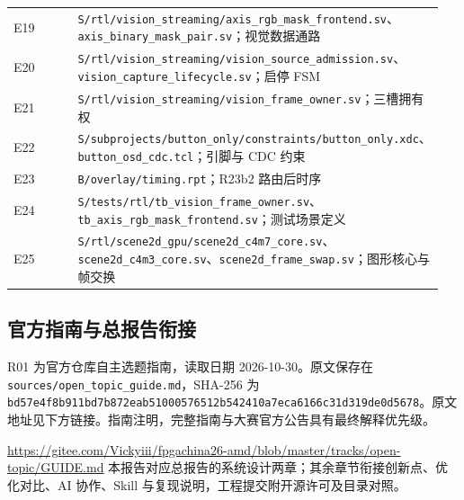 {\begin{longtable}{@{}>{\raggedright\arraybackslash}p{0.29\linewidth}>{\raggedright\arraybackslash}p{0.66\linewidth}@{}}
E19 & \nolinkurl{S/rtl/vision_streaming/axis_rgb_mask_frontend.sv}、\nolinkurl{axis_binary_mask_pair.sv}；视觉数据通路\\
E20 & \nolinkurl{S/rtl/vision_streaming/vision_source_admission.sv}、\nolinkurl{vision_capture_lifecycle.sv}；启停 FSM\\
E21 & \nolinkurl{S/rtl/vision_streaming/vision_frame_owner.sv}；三槽拥有权\\
E22 & \nolinkurl{S/subprojects/button_only/constraints/button_only.xdc}、\nolinkurl{button_osd_cdc.tcl}；引脚与 CDC 约束\\
E23 & \nolinkurl{B/overlay/timing.rpt}；R23b2 路由后时序\\
E24 & \nolinkurl{S/tests/rtl/tb_vision_frame_owner.sv}、\nolinkurl{tb_axis_rgb_mask_frontend.sv}；测试场景定义\\
E25 & \nolinkurl{S/rtl/scene2d_gpu/scene2d_c4m7_core.sv}、\nolinkurl{scene2d_c4m3_core.sv}、\nolinkurl{scene2d_frame_swap.sv}；图形核心与帧交换\\
\end{longtable}}
\subsection{官方指南与总报告衔接}
R01 为官方仓库自主选题指南，读取日期 2026-10-30。原文保存在 \nolinkurl{sources/open_topic_guide.md}，SHA-256 为 \nolinkurl{bd57e4f8b911bd7b872eab51000576512b542410a7eca6166c31d319de0d5678}。原文地址见下方链接。指南注明，完整指南与大赛官方公告具有最终解释优先级。

\url{https://gitee.com/Vickyiii/fpgachina26-amd/blob/master/tracks/open-topic/GUIDE.md}
本报告对应总报告的系统设计两章；其余章节衔接创新点、优化对比、AI 协作、Skill 与复现说明，工程提交附开源许可及目录对照。

